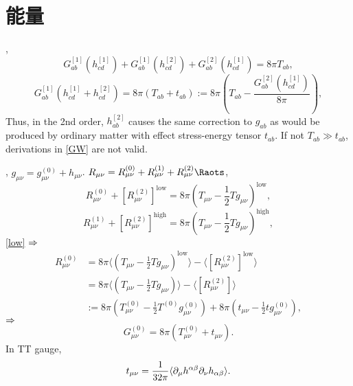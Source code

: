 \chapter{能量}

\cite{Wald1984}, 
\begin{equation}
    G_{ab}^{[1]}(h_{cd}^{[1]})+G_{ab}^{[1]}(h_{cd}^{[2]})+G_{ab}^{[2]}(h_{cd}^{[1]})=8\pi T_{ab},
\end{equation}
\begin{equation}
    G_{ab}^{[1]}(h_{cd}^{[1]}+h_{cd}^{[2]})=8\pi (T_{ab}+t_{ab}):=8\pi (T_{ab}-\frac{G_{ab}^{[2]}(h_{cd}^{[1]})}{8\pi}),
\end{equation}
Thus, in the 2nd order, $h_{ab}^{[2]}$ causes the same correction to $g_{ab}$ as would be produced by ordinary matter with effect stress-energy tensor $t_{ab}$. If not $T_{ab}\gg t_{ab}$, derivations in \ref{GW} are not valid.

\cite{Maggiore2014}, $g_{\mu\nu}={g}_{\mu\nu}^{(0)}+h_{\mu\nu}$. $R_{\mu\nu}=R_{\mu\nu}^{(0)}+R_{\mu\nu}^{(1)}+R_{\mu\nu}^{(2)}\Raots$,
\begin{equation}
    R_{\mu\nu}^{(0)}+[R_{\mu\nu}^{(2)}]^\text{low}=8\pi(T_{\mu\nu}-\frac{1}{2}Tg_{\mu\nu})^\text{low},\label{low}
\end{equation}
\begin{equation}
    R_{\mu\nu}^{(1)}+[R_{\mu\nu}^{(2)}]^\text{high}=8\pi(T_{\mu\nu}-\frac{1}{2}Tg_{\mu\nu})^\text{high},\label{high}
\end{equation}
\eqref{low} $\Rightarrow$
\begin{align}
    R_{\mu\nu}^{(0)}&=8\pi\langle (T_{\mu\nu}-\frac{1}{2}Tg_{\mu\nu})^\text{low}\rangle-\langle[R_{\mu\nu}^{(2)}]^\text{low}\rangle\\
    &=8\pi\langle (T_{\mu\nu}-\frac{1}{2}Tg_{\mu\nu})\rangle-\langle[R_{\mu\nu}^{(2)}]\rangle\\
    &:=8\pi({T}_{\mu\nu}^{(0)}-\frac{1}{2}{T}^{(0)}{g}_{\mu\nu}^{(0)})+8\pi(t_{\mu\nu}-\frac{1}{2}t{g}_{\mu\nu}^{(0)}),
\end{align}
$\Rightarrow$
\begin{equation}
    G_{\mu\nu}^{(0)}=8\pi({T}_{\mu\nu}^{(0)}+t_{\mu\nu}).
\end{equation}
In TT gauge,
\begin{equation}
    t_{\mu\nu}=\frac{1}{32\pi}\langle\partial_\mu h^{\alpha\beta}\partial_\nu h_{\alpha\beta}\rangle.
\end{equation}
